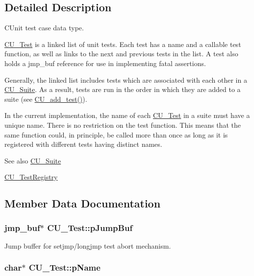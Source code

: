\subsection{Detailed Description}
C\+Unit test case data type. 

\hyperlink{struct_c_u___test}{C\+U\+\_\+\+Test} is a linked list of unit tests. Each test has a name and a callable test function, as well as links to the next and previous tests in the list. A test also holds a jmp\+\_\+buf reference for use in implementing fatal assertions. 

Generally, the linked list includes tests which are associated with each other in a \hyperlink{struct_c_u___suite}{C\+U\+\_\+\+Suite}. As a result, tests are run in the order in which they are added to a suite (see \hyperlink{group___framework_gad9f198a8a5fa8cc6870c3c8be873869f}{C\+U\+\_\+add\+\_\+test()}). 

In the current implementation, the name of each \hyperlink{struct_c_u___test}{C\+U\+\_\+\+Test} in a suite must have a unique name. There is no restriction on the test function. This means that the same function could, in principle, be called more than once as long as it is registered with different tests having distinct names. \begin{DoxySeeAlso}{See also}
\hyperlink{struct_c_u___suite}{C\+U\+\_\+\+Suite} 

\hyperlink{struct_c_u___test_registry}{C\+U\+\_\+\+Test\+Registry} 
\end{DoxySeeAlso}


\subsection{Member Data Documentation}
\hypertarget{struct_c_u___test_ada5212c6bacdbaf9319968d895a69ce4}{
\subsubsection[{p\+Jump\+Buf}]{\setlength{\rightskip}{0pt plus 5cm}jmp\+\_\+buf$\ast$ C\+U\+\_\+\+Test\+::p\+Jump\+Buf}}\label{struct_c_u___test_ada5212c6bacdbaf9319968d895a69ce4}


Jump buffer for setjmp/longjmp test abort mechanism. 

\hypertarget{struct_c_u___test_ae1f688f9e108805d7f59ee364c5eb2a2}{
\subsubsection[{p\+Name}]{\setlength{\rightskip}{0pt plus 5cm}char$\ast$ C\+U\+\_\+\+Test\+::p\+Name}}\label{struct_c_u___test_ae1f688f9e108805d7f59ee364c5eb2a2}


